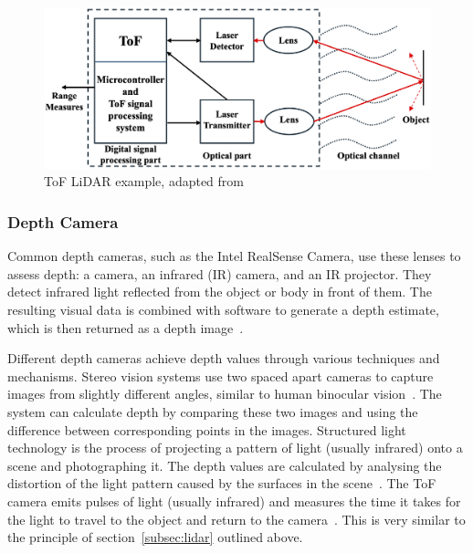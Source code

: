 \begin{figure}[H]
    \centering
    \includegraphics[width=1\linewidth]{figs/tof.png}
    \caption{ToF LiDAR example, adapted from~\cite{lidarexample}}
    \label{fig:lidar_example}
\end{figure}

\subsubsection{Depth Camera}
Common depth cameras, such as the Intel RealSense Camera, use these lenses to assess depth: 
a camera, an infrared (IR) camera, and an IR projector. 
They detect infrared light reflected from the object or body in front of them. 
The resulting visual data is combined with software to generate a depth estimate, 
which is then returned as a depth image~\cite{depthcam}.


Different depth cameras achieve depth values through various techniques and mechanisms. 
Stereo vision systems use two spaced apart cameras to capture images from slightly different angles, 
similar to human binocular vision~\cite{kinect}. 
The system can calculate depth by comparing these two images and using the difference between corresponding points in the images. 
Structured light technology is the process of projecting a pattern of light (usually infrared) onto a scene and photographing it. 
The depth values are calculated by analysing the distortion of the light pattern caused by the surfaces in the scene~\cite{rgbdmapping}.
The ToF camera emits pulses of light (usually infrared) and measures the time it takes for the light to travel to the object and return to the camera~\cite{tof}. 
This is very similar to the principle of section~\ref{subsec:lidar} outlined above.

